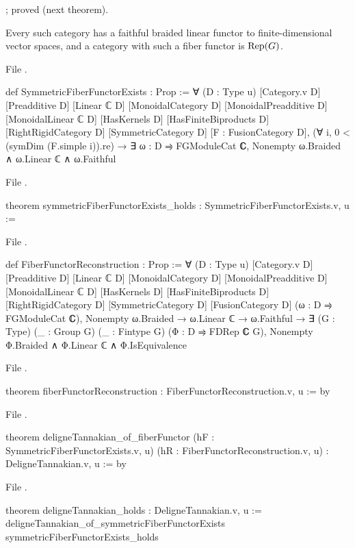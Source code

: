 \begin{status}
; proved (next theorem).
\end{status}

\begin{theorem}\label{l21:thm:deligne}
Every such category has a faithful braided linear functor to finite-dimensional vector spaces, and a category with such a
fiber functor is $\operatorname{Rep}(G)$.
\end{theorem}
\noindent File .
\begin{leancode}
def SymmetricFiberFunctorExists : Prop :=
  ∀ (D : Type u) [Category.{v} D] [Preadditive D] [Linear ℂ D] [MonoidalCategory D]
    [MonoidalPreadditive D] [MonoidalLinear ℂ D] [HasKernels D] [HasFiniteBiproducts D]
    [RightRigidCategory D] [SymmetricCategory D] [F : FusionCategory D],
    (∀ i, 0 < (symDim (F.simple i)).re) →
    ∃ ω : D ⥤ FGModuleCat ℂ, Nonempty ω.Braided ∧ ω.Linear ℂ ∧ ω.Faithful
\end{leancode}
\noindent File .
\begin{leancode}
theorem symmetricFiberFunctorExists_holds : SymmetricFiberFunctorExists.{v, u} :=
\end{leancode}
\noindent File .
\begin{leancode}
def FiberFunctorReconstruction : Prop :=
  ∀ (D : Type u) [Category.{v} D] [Preadditive D] [Linear ℂ D] [MonoidalCategory D]
    [MonoidalPreadditive D] [MonoidalLinear ℂ D] [HasKernels D] [HasFiniteBiproducts D]
    [RightRigidCategory D] [SymmetricCategory D] [FusionCategory D]
    (ω : D ⥤ FGModuleCat ℂ), Nonempty ω.Braided → ω.Linear ℂ → ω.Faithful →
    ∃ (G : Type) (_ : Group G) (_ : Fintype G) (Φ : D ⥤ FDRep ℂ G),
      Nonempty Φ.Braided ∧ Φ.Linear ℂ ∧ Φ.IsEquivalence
\end{leancode}
\noindent File .
\begin{leancode}
theorem fiberFunctorReconstruction : FiberFunctorReconstruction.{v, u} := by
\end{leancode}
\noindent File .
\begin{leancode}
theorem deligneTannakian_of_fiberFunctor (hF : SymmetricFiberFunctorExists.{v, u})
    (hR : FiberFunctorReconstruction.{v, u}) : DeligneTannakian.{v, u} := by
\end{leancode}
\noindent File .
\begin{leancode}
theorem deligneTannakian_holds : DeligneTannakian.{v, u} :=
  deligneTannakian_of_symmetricFiberFunctorExists symmetricFiberFunctorExists_holds
\end{leancode}

